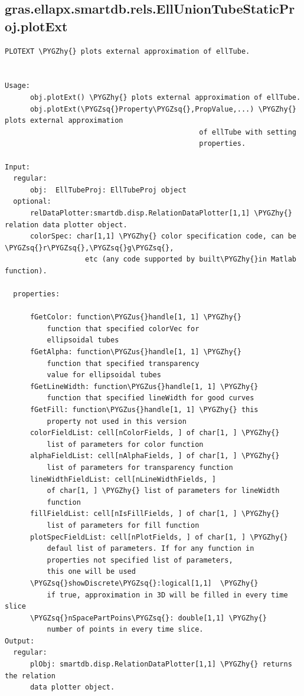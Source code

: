 \documentclass[letterpaper,10pt,english]{sphinxmanual}
\def\PYGZus{\char`\_}
\def\PYGZhy{\char`\-}
\def\PYGZsq{\char`\'}
\begin{document}
\subsection{gras.ellapx.smartdb.rels.EllUnionTubeStaticProj.plotExt}
\label{chap_functions:gras-ellapx-smartdb-rels-elluniontubestaticproj-plotext}
\begin{Verbatim}[commandchars=\\\{\}]
PLOTEXT \PYGZhy{} plots external approximation of ellTube.


Usage:
      obj.plotExt() \PYGZhy{} plots external approximation of ellTube.
      obj.plotExt(\PYGZsq{}Property\PYGZsq{},PropValue,...) \PYGZhy{} plots external approximation
                                              of ellTube with setting
                                              properties.

Input:
  regular:
      obj:  EllTubeProj: EllTubeProj object
  optional:
      relDataPlotter:smartdb.disp.RelationDataPlotter[1,1] \PYGZhy{} relation data plotter object.
      colorSpec: char[1,1] \PYGZhy{} color specification code, can be \PYGZsq{}r\PYGZsq{},\PYGZsq{}g\PYGZsq{},
                   etc (any code supported by built\PYGZhy{}in Matlab function).

  properties:

      fGetColor: function\PYGZus{}handle[1, 1] \PYGZhy{}
          function that specified colorVec for
          ellipsoidal tubes
      fGetAlpha: function\PYGZus{}handle[1, 1] \PYGZhy{}
          function that specified transparency
          value for ellipsoidal tubes
      fGetLineWidth: function\PYGZus{}handle[1, 1] \PYGZhy{}
          function that specified lineWidth for good curves
      fGetFill: function\PYGZus{}handle[1, 1] \PYGZhy{} this
          property not used in this version
      colorFieldList: cell[nColorFields, ] of char[1, ] \PYGZhy{}
          list of parameters for color function
      alphaFieldList: cell[nAlphaFields, ] of char[1, ] \PYGZhy{}
          list of parameters for transparency function
      lineWidthFieldList: cell[nLineWidthFields, ]
          of char[1, ] \PYGZhy{} list of parameters for lineWidth
          function
      fillFieldList: cell[nIsFillFields, ] of char[1, ] \PYGZhy{}
          list of parameters for fill function
      plotSpecFieldList: cell[nPlotFields, ] of char[1, ] \PYGZhy{}
          defaul list of parameters. If for any function in
          properties not specified list of parameters,
          this one will be used
      \PYGZsq{}showDiscrete\PYGZsq{}:logical[1,1]  \PYGZhy{}
          if true, approximation in 3D will be filled in every time slice
      \PYGZsq{}nSpacePartPoins\PYGZsq{}: double[1,1] \PYGZhy{}
          number of points in every time slice.
Output:
  regular:
      plObj: smartdb.disp.RelationDataPlotter[1,1] \PYGZhy{} returns the relation
      data plotter object.
\end{Verbatim}
\end{document}
